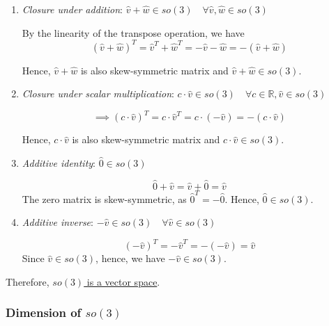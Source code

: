 \begin{enumerate}
    \item \textit{Closure under addition}:
          \( \hat v + \hat w \in so(3) \quad \forall \hat v, \hat w \in so(3) \)

          By the linearity of the transpose operation, we have
          \begin{equation*}
              {(\hat v + \hat w)}^{T} = \hat v^{T} + \hat w^{T} = -\hat v - \hat w = -(\hat v + \hat w)
          \end{equation*}

          Hence, \( \hat v + \hat w \) is also skew-symmetric matrix and \( \hat v + \hat w \in so(3) \).

    \item \textit{Closure under scalar multiplication}:
          \( c \cdot \hat v \in so(3) \quad \forall c \in \mathbb{R}, \hat v \in so(3) \)

          \begin{equation*}
              \implies
              {(c \cdot \hat v)}^{T} = c \cdot \hat v^{T} = c \cdot (-\hat v) = -(c \cdot \hat v)
          \end{equation*}

          Hence, \( c \cdot \hat v \) is also skew-symmetric matrix and \( c \cdot \hat v \in so(3) \).

    \item \textit{Additive identity}:
          \( \hat 0 \in so(3) \)

          \begin{equation*}
              \hat 0 + \hat v = \hat v + \hat 0 = \hat v
          \end{equation*}
          The zero matrix is skew-symmetric, as \( \hat 0^{T} = -\hat 0 \).
          Hence, \( \hat 0 \in so(3) \).

    \item \textit{Additive inverse}:
          \( -\hat v \in so(3) \quad \forall \hat v \in so(3) \)

          \begin{equation*}
              {(-\hat v)}^{T} = -\hat v^{T} = -(-\hat v) = \hat v
          \end{equation*}
          Since \( \hat v \in so(3) \), hence, we have \( -\hat v \in so(3) \).
\end{enumerate}

Therefore, \underline{\( so(3) \) is a vector space}.

\subsubsection*{Dimension of \( so(3) \)}

